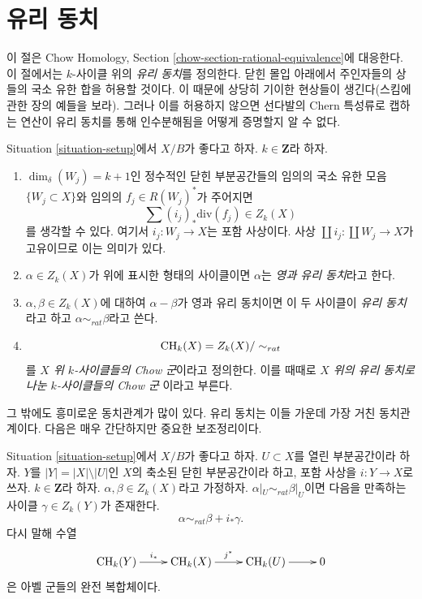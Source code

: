 \section{유리 동치}
\label{section-rational-equivalence}

\noindent
이 절은 Chow Homology, Section
\ref{chow-section-rational-equivalence}에 대응한다.
이 절에서는 $k$-사이클 위의 {\it 유리 동치}를 정의한다.
닫힌 몰입 아래에서 주인자들의 상들의 국소 유한 합을 허용할 것이다.
이 때문에 상당히 기이한 현상들이 생긴다(스킴에 관한 장의 예들을 보라).
그러나 이를 허용하지 않으면 선다발의 Chern 특성류로 캡하는 연산이
유리 동치를 통해 인수분해됨을 어떻게 증명할지 알 수 없다.

\begin{definition}
\label{definition-rational-equivalence}
Situation \ref{situation-setup}에서 $X/B$가 좋다고 하자.
$k \in \mathbf{Z}$라 하자.
\begin{enumerate}
\item $\dim_\delta(W_j) = k + 1$인 정수적인 닫힌 부분공간들의 임의의
국소 유한 모음 $\{W_j \subset X\}$와 임의의
$f_j \in R(W_j)^*$가 주어지면
$$
\sum (i_j)_*\text{div}(f_j) \in Z_k(X)
$$
를 생각할 수 있다. 여기서 $i_j : W_j \to X$는 포함 사상이다.
사상 $\coprod i_j : \coprod W_j \to X$가 고유이므로 이는 의미가 있다.
\item $\alpha \in Z_k(X)$가 위에 표시한 형태의 사이클이면
$\alpha$는 {\it 영과 유리 동치}라고 한다.
\item $\alpha, \beta \in Z_k(X)$에 대하여 $\alpha - \beta$가
영과 유리 동치이면 이 두 사이클이 {\it 유리 동치}라고 하고
$\alpha \sim_{rat} \beta$라고 쓴다.
\item
$$
\mathop{\mathrm{CH}}\nolimits_k(X) = Z_k(X) / \sim_{rat}
$$
를 {\it $X$ 위 $k$-사이클들의 Chow 군}이라고 정의한다.
이를 때때로 {\it $X$ 위의 유리 동치로 나눈 $k$-사이클들의 Chow 군}
이라고 부른다.
\end{enumerate}
\end{definition}

\noindent
그 밖에도 흥미로운 동치관계가 많이 있다. 유리 동치는 이들 가운데
가장 거친 동치관계이다. 다음은 매우 간단하지만 중요한 보조정리이다.

\begin{lemma}
\label{lemma-restrict-to-open}
Situation \ref{situation-setup}에서 $X/B$가 좋다고 하자.
$U \subset X$를 열린 부분공간이라 하자. $Y$를
$|Y| = |X| \setminus |U|$인 $X$의 축소된 닫힌 부분공간이라 하고,
포함 사상을 $i : Y \to X$로 쓰자. $k \in \mathbf{Z}$라 하자.
$\alpha, \beta \in Z_k(X)$라고 가정하자.
$\alpha|_U \sim_{rat} \beta|_U$이면 다음을 만족하는 사이클
$\gamma \in Z_k(Y)$가 존재한다.
$$
\alpha \sim_{rat} \beta + i_*\gamma.
$$
다시 말해 수열
$$
\xymatrix{
\CH_k(Y) \ar[r]^{i_*} & \CH_k(X) \ar[r]^{j^*} & \CH_k(U) \ar[r] & 0
}
$$
은 아벨 군들의 완전 복합체이다.
\end{lemma}

